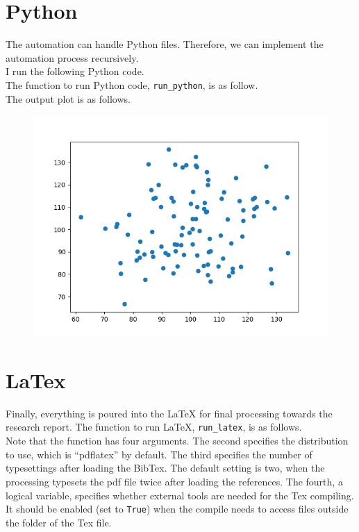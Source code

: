 \documentclass[12pt, a4paper]{article}
\begin{document}
\section{Python}

The automation can handle Python files. Therefore, we can implement the automation process recursively.\\

I run the following Python code.\\



The function to run Python code, \texttt{run\_python}, is as follow.\\



The output plot is as follows.\\

\begin{figure}[H]
	\includegraphics[width=.5\textwidth]{sample_python_graph.png}
\end{figure}

\section{LaTex}

Finally, everything is poured into the LaTeX for final processing towards the research report. The function to run LaTeX, \texttt{run\_latex}, is as follows.\\



Note that the function has four arguments. The second specifies the distribution to use, which is ``pdflatex'' by default. The third specifies the number of typesettings after loading the BibTex. The default setting is two, when the processing typesets the pdf file twice after loading the references. The fourth, a logical variable, specifies whether external tools are needed for the Tex compiling. It should be enabled (set to \texttt{True}) when the compile needs to access files outside the folder of the Tex file.\\
\end{document}
